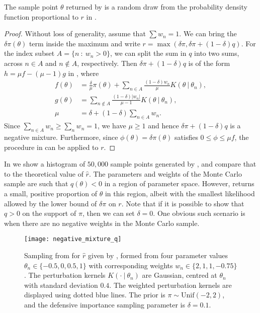\documentclass[review,demo]{siamonline190516}
\begin{document}
\begin{proposition}
The sample point $\theta$ returned by  is a random draw from the probability density function proportional to $r$ in .
\end{proposition}
\begin{proof}
Without loss of generality, assume that $\sum w_n = 1$.
We can bring the $\delta \pi(\theta)$ term inside the maximum and write $r = \max(\delta \pi, \delta \pi + (1-\delta) q)$.
For the index subset $A = \{ n~:~w_n>0 \}$, we can split the sum in $q$ into two sums, across $n \in A$ and $n \notin A$, respectively.
Then $\delta \pi + (1-\delta) q$ is of the form $h = \mu f - (\mu - 1) g$ in , where
\begin{align*}
f(\theta) &= \frac{\delta}{\mu} \pi(\theta) + \sum_{n \in A} \frac{(1-\delta) w_n}{\mu} K(\theta~|~\theta_n),
\\
g(\theta) &= \sum_{n \notin A} \frac{(1-\delta)\left|w_n\right|}{\mu - 1} K(\theta~|~\theta_n),
\\
\mu &= \delta + (1-\delta) \sum_{n \in A} w_n.
\end{align*}
Since $\sum_{n \in A} w_n \geq \sum_n w_n = 1$, we have $\mu \geq 1$ and hence $\delta \pi + (1-\delta) q$ is a negative mixture.
Furthermore, since $\phi(\theta) = \delta \pi(\theta)$ satisfies $0 \leq \phi\leq \mu f$, the procedure in  can be applied to $r$.
\end{proof}

In  we show a histogram of $50,000$ sample points generated by , and compare that to the theoretical value of $\hat r$.
The parameters and weights of the Monte Carlo sample are such that $q(\theta) < 0$ in a region of parameter space. 
However,  returns a small, positive proportion of $\theta$ in this region, albeit with the smallest likelihood allowed by the lower bound of $\delta \pi$ on $r$.
Note that if it is possible to show that $q>0$ on the support of $\pi$, then we can set $\delta=0$.
One obvious such scenario is when there are no negative weights in the Monte Carlo sample.

\begin{figure}
\centering
\texttt{[image: negative\_mixture\_q]}
\caption{
Sampling from  for $\hat r$ given by , formed from four parameter values $\theta_n \in \{-0.5, 0, 0.5, 1\}$ with corresponding weights $w_n \in \{2, 1, 1, -0.75\}$. 
The perturbation kernels $K(\cdot~|~\theta_n)$ are Gaussian, centred at $\theta_n$ with standard deviation $0.4$.
The weighted perturbation kernels are displayed using dotted blue lines. 
The prior is $\pi \sim \mathrm{Unif}(-2, 2)$, and the defensive importance sampling parameter is $\delta = 0.1$.
}
\label{fig:negative_mixture_q}
\end{figure}
\end{document}
